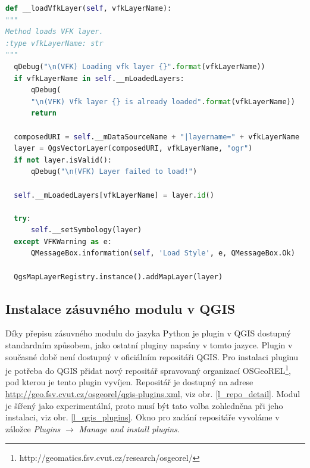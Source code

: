 \documentclass[a4paper,12pt,oneside]{book}
\begin{document}
\newpage
\begin{lstlisting}[language=Python, 
		    caption=Kód pro načtení vektorové vrstvy v jazyce Python, 
		    keywordstyle=\color{blue}\ttfamily,
		    stringstyle=\color{red}\ttfamily,
		    commentstyle=\color{green}\ttfamily, morekeywords={qDebug,QString,QgsVectorLayer,QgsMapLayerRegistry,QMessageBox,self},
		    label=l_loadLayerPython]
def __loadVfkLayer(self, vfkLayerName):
"""
Method loads VFK layer.
:type vfkLayerName: str
"""
  qDebug("\n(VFK) Loading vfk layer {}".format(vfkLayerName))
  if vfkLayerName in self.__mLoadedLayers:
      qDebug(
	  "\n(VFK) Vfk layer {} is already loaded".format(vfkLayerName))
      return

  composedURI = self.__mDataSourceName + "|layername=" + vfkLayerName
  layer = QgsVectorLayer(composedURI, vfkLayerName, "ogr")
  if not layer.isValid():
      qDebug("\n(VFK) Layer failed to load!")

  self.__mLoadedLayers[vfkLayerName] = layer.id()

  try:
      self.__setSymbology(layer)
  except VFKWarning as e:
      QMessageBox.information(self, 'Load Style', e, QMessageBox.Ok)

  QgsMapLayerRegistry.instance().addMapLayer(layer)
\end{lstlisting}

\subsection{Instalace zásuvného modulu v QGIS}
Díky přepisu zásuvného modulu do jazyka Python je plugin v QGIS dostupný standardním způsobem, jako ostatní pluginy napsány v tomto jazyce. Plugin v současné době není dostupný v oficiálním repositáři QGIS. Pro instalaci pluginu je potřeba do QGIS přidat nový repositář spravovaný organizací OSGeoREL\footnote{http://geomatics.fsv.cvut.cz/research/osgeorel/}, pod kterou je tento plugin vyvíjen. Repositář je dostupný na adrese \url{http://geo.fsv.cvut.cz/osgeorel/qgis-plugins.xml}, viz obr. \ref{l_repo_detail}. Modul je šířený jako experimentální, proto musí být tato volba zohledněna při jeho instalaci, viz obr. \ref{l_qgis_plugins}. Okno pro zadání repositáře vyvoláme v záložce \textit{Plugins} $\rightarrow$ \textit{Manage and install plugins}.
\end{document}
